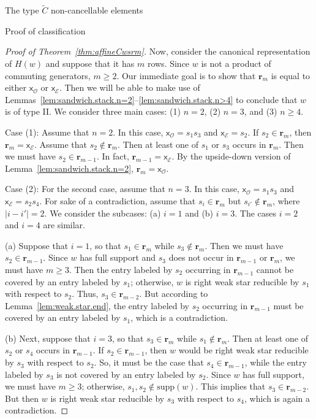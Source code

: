 \documentclass[12pt]{amsart}
\newcommand{\C}{\widetilde{C}}
\renewcommand{\O}{\mathcal{O}}
\newcommand{\E}{\mathcal{E}}
\newcommand{\x}{\mathsf{x}}
\newcommand{\supp}{\mathrm{supp}}
\renewcommand{\(}{\left(}
\renewcommand{\)}{\right)}
\renewcommand{\r}{\mathbf{r}}
\begin{document}
\begin{section}{The type $\C$ non-cancellable elements}
\begin{subsection}{Proof of classification}
\begin{proof}[Proof of Theorem~\ref{thm:affineCwsrm}]
Now, consider the canonical representation of $H(w)$ and suppose that it has $m$ rows.  Since $w$ is not a product of commuting generators, $m\geq 2$.  Our immediate goal is to show that $\r_m$ is equal to either $\x_\O$ or $\x_\E$.  Then we will be able to make use of Lemmas~\ref{lem:sandwich.stack.n=2}--\ref{lem:sandwich.stack.n>4} to conclude that $w$ is of type II.  We consider three main cases: (1) $n=2$, (2) $n=3$, and (3) $n \geq 4$.

Case (1):  Assume that $n=2$.  In this case, $\x_{\O}=s_{1}s_{3}$ and $\x_{\E}=s_{2}$.  If $s_{2} \in \r_{m}$, then $\r_{m}=\x_{\E}$.  Assume that $s_{2} \notin \r_{m}$.  Then at least one of $s_{1}$ or $s_{3}$ occurs in $\r_{m}$.  Then we must have $s_{2} \in \r_{m-1}$.  In fact, $\r_{m-1}=\x_{\E}$.  By the upside-down version of Lemma~\ref{lem:sandwich.stack.n=2}, $\r_{m}=\x_{\O}$.

Case (2):  For the second case, assume that $n=3$.  In this case, $\x_{\O}=s_{1}s_{3}$ and $\x_{\E}=s_{2}s_{4}$.  For sake of a contradiction, assume that $s_{i} \in \r_{m}$ but $s_{i'} \notin \r_{m}$, where $|i-i'|=2$.  We consider the subcases: (a) $i=1$ and (b) $i=3$.  The cases $i=2$ and $i=4$ are similar.

(a)  Suppose that $i=1$, so that $s_{1} \in \r_{m}$ while $s_{3} \notin \r_{m}$.  Then we must have $s_{2} \in \r_{m-1}$.  Since $w$ has full support and $s_{3}$ does not occur in $\r_{m-1}$ or $\r_{m}$, we must have $m \geq 3$.  Then the entry labeled by $s_{2}$ occurring in $\r_{m-1}$ cannot be covered by an entry labeled by $s_{1}$; otherwise, $w$ is right weak star reducible by $s_{1}$ with respect to $s_{2}$.  Thus, $s_{3} \in \r_{m-2}$.  But according to Lemma~\ref{lem:weak.star.end}, the entry labeled by $s_{2}$ occurring in $\r_{m-1}$ must be covered by an entry labeled by $s_{1}$, which is a contradiction.  

(b)  Next, suppose that $i=3$, so that $s_{3} \in \r_{m}$ while $s_{1} \notin \r_{m}$.  Then at least one of $s_{2}$ or $s_{4}$ occurs in $\r_{m-1}$.  If $s_{2} \in \r_{m-1}$, then $w$ would be right weak star reducible by $s_{3}$ with respect to $s_{2}$.  So, it must be the case that $s_{4} \in \r_{m-1}$, while the entry labeled by $s_{3}$ is not covered by an entry labeled by $s_{2}$.  Since $w$ has full support, we must have $m\geq 3$; otherwise, $s_{1}, s_{2} \notin \supp(w)$.  This implies that $s_{3} \in \r_{m-2}$.  But then $w$ is right weak star reducible by $s_{3}$ with respect to $s_{4}$, which is again a contradiction.


\end{proof}
\end{subsection}
\end{section}
\end{document}
